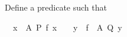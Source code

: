 \begin{isabellebody}
\isamarkupfalse%
%
\begin{isamarkuptext}%
Define a predicate  such that%
\end{isamarkuptext}%
\isamarkuptrue%
\ {\isachardoublequote}{\isasymforall}\ x\ {\isasymin}\ A{\isachardot}\ P\ {\isacharparenleft}f\ x{\isacharparenright}\ {\isasymLongrightarrow}\ \ {\isasymforall}\ y\ {\isasymin}\ f\ {\isacharbackquote}\ A{\isachardot}\ Q\ y{\isachardoublequote}\isamarkupfalse%
\isanewline
\isanewline
\isamarkupfalse%
\isanewline
\isamarkupfalse%
\end{isabellebody}%
